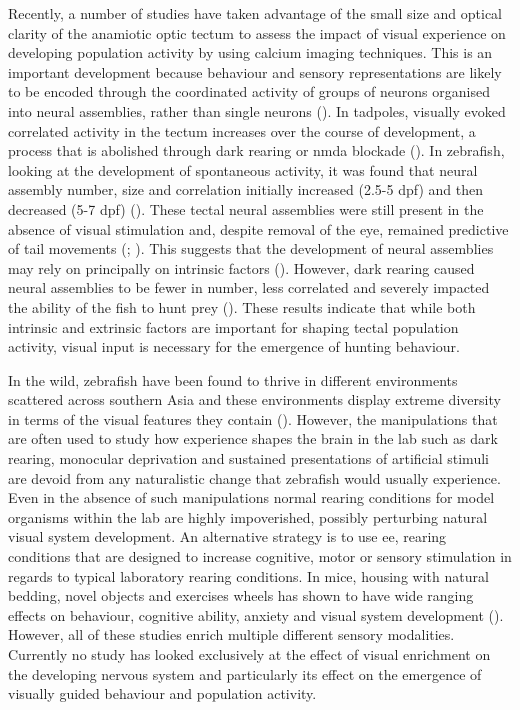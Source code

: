 Recently, a number of studies have taken advantage of the small size and optical clarity of the anamiotic optic tectum to assess the impact of visual experience on developing population activity by using calcium imaging techniques. This is an important development because behaviour and sensory representations are likely to be encoded through the coordinated activity of groups of neurons organised into neural assemblies, rather than single neurons (\cite{Yuste2015}). In tadpoles, visually evoked correlated activity in the tectum increases over the course of development, a process that is abolished through dark rearing or \gls{nmda} blockade (\cite{Xu2011VisualSystem}). In zebrafish, looking at the development of spontaneous activity, it was found that neural assembly number, size and correlation initially increased (2.5-5 \gls{dpf}) and then decreased (5-7 \gls{dpf}) (\cite{Avitan2017}). These tectal neural assemblies were still present in the absence of visual stimulation and, despite removal of the eye, remained predictive of tail movements (\cite{Avitan2017}; \cite{Pietri2017}). This suggests that the development of neural assemblies may rely on principally on intrinsic factors (\cite{Pietri2017}). However, dark rearing caused neural assemblies to be fewer in number, less correlated and severely impacted the ability of the fish to hunt prey (\cite{Avitan2017}). These results indicate that while both intrinsic and extrinsic factors are important for shaping tectal population activity, visual input is necessary for the emergence of hunting behaviour.

In the wild, zebrafish have been found to thrive in different environments scattered across southern Asia and these environments display extreme diversity in terms of the visual features they contain (\cite{Engeszer2007ZebrafishField}).  However, the manipulations that are often used to study how experience shapes the brain in the lab such as dark rearing, monocular deprivation and 
sustained presentations of artificial stimuli are devoid from any naturalistic change that zebrafish would usually experience. Even in the absence of such manipulations normal rearing conditions for model organisms within the lab are highly impoverished, possibly perturbing natural visual system development. An alternative strategy is to use \gls{ee}, rearing conditions that are designed to increase cognitive, motor or sensory stimulation in regards to typical laboratory rearing conditions. In mice, housing with natural bedding,  novel objects and exercises wheels has shown to have wide ranging effects on behaviour, cognitive ability, anxiety and visual system development (\cite{Nithianantharajah2006EnrichedSystem, Beaulieu1990EffectProperties,Beaulieu1987EffectCortex, Mainardi2010EnvironmentalCortex,Sale2007EnvironmentalInhibition}). However, all of these studies enrich multiple different sensory modalities. Currently no study has looked exclusively at the effect of visual enrichment on the developing nervous system and particularly its effect on the emergence of visually guided behaviour and population activity.


